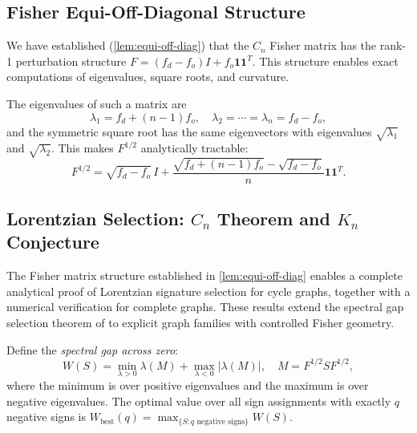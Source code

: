 \documentclass[11pt]{article}
\theoremstyle{definition}
\theoremstyle{remark}
\newcommand{\Fish}{F}
\newcommand{\Met}{M}
\begin{document}
\subsection{Fisher Equi-Off-Diagonal Structure}
\label{subsec:equi-off-diag}

We have established (\cref{lem:equi-off-diag}) that the $C_n$ Fisher
matrix has the rank-1 perturbation structure
$\Fish = (f_d - f_o) I + f_o \mathbf{1}\mathbf{1}^T$. This structure
enables exact computations of eigenvalues, square roots, and curvature.

The eigenvalues of such a matrix are
\begin{equation}
  \lambda_1 = f_d + (n-1) f_o, \quad
  \lambda_2 = \cdots = \lambda_n = f_d - f_o,
  \label{eq:fisher-eigs-cycle}
\end{equation}
and the symmetric square root has the same eigenvectors with eigenvalues
$\sqrt{\lambda_1}$ and $\sqrt{\lambda_2}$. This makes $\Fish^{1/2}$
analytically tractable:
\begin{equation}
  \Fish^{1/2} = \sqrt{f_d - f_o}\, I
    + \frac{\sqrt{f_d + (n-1)f_o} - \sqrt{f_d - f_o}}{n}
      \mathbf{1}\mathbf{1}^T.
  \label{eq:fisher-sqrt-cycle}
\end{equation}

\subsection{Lorentzian Selection: $C_n$ Theorem and $K_n$ Conjecture}
\label{subsec:lorentzian-selection-graphs}

The Fisher matrix structure established in \cref{lem:equi-off-diag} enables
a complete analytical proof of Lorentzian signature selection for cycle graphs,
together with a numerical verification for complete graphs. These results
extend the spectral gap selection theorem of \cite{Paper5} to explicit graph
families with controlled Fisher geometry.

Define the \emph{spectral gap across zero}:
\begin{equation}
  W(S) = \min_{\lambda > 0} \lambda(\Met) + \max_{\lambda < 0} |\lambda(\Met)|,
  \quad \Met = \Fish^{1/2} S \Fish^{1/2},
  \label{eq:W-gap-def}
\end{equation}
where the minimum is over positive eigenvalues and the maximum is over negative
eigenvalues. The optimal value over all sign assignments with exactly $q$ negative
signs is $W_{\mathrm{best}}(q) = \max_{\{S : q \text{ negative signs}\}} W(S)$.
\end{document}
